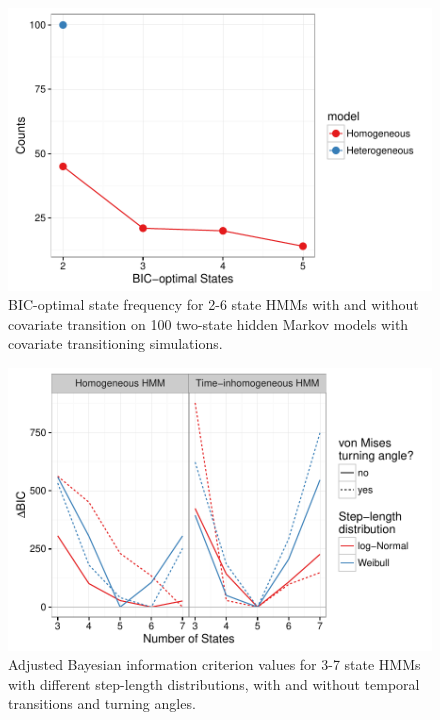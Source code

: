 \documentclass{article}\usepackage[]{graphicx}\usepackage{xcolor}
\makeatletter
\def\maxwidth{ %
  \ifdim\Gin@nat@width>\linewidth
    \linewidth
  \else
    \Gin@nat@width
  \fi
}
\newenvironment{knitrout}{}{} %
\makeatother
\begin{document}
\begin{knitrout}
\color{fgcolor}\begin{figure}
\includegraphics[width=\maxwidth]{figure/sim_results-1} \caption[BIC-optimal state frequency for 2-6 state HMMs with and without covariate transition on 100 two-state hidden Markov models with covariate transitioning simulations]{BIC-optimal state frequency for 2-6 state HMMs with and without covariate transition on 100 two-state hidden Markov models with covariate transitioning simulations.}\label{fig:sim_results}
\end{figure}


\end{knitrout}


\clearpage


\begin{knitrout}
\color{fgcolor}\begin{figure}
\includegraphics[width=\maxwidth]{figure/BICred_plot-1} \caption[Adjusted Bayesian information criterion values for 3-7 state HMMs with different step-length distributions, with and without temporal transitions and turning angles]{Adjusted Bayesian information criterion values for 3-7 state HMMs with different step-length distributions, with and without temporal transitions and turning angles.}\label{fig:BICred_plot}
\end{figure}


\end{knitrout}
\end{document}
